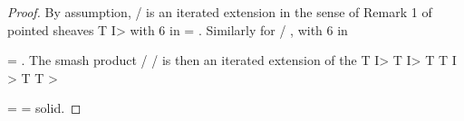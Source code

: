 \documentclass[11pt,a4paper]{article}
\theoremstyle{plain}
\theoremstyle{definition}
\begin{document}
\begin{proof} By assumption, / is an iterated extension in the sense of Remark 1 of
pointed sheaves T I> with 
6 in = . Similarly for /  , with  6 in


= . The smash product / / is then an iterated extension of the
T I>
T  I> 
T T  I >  T 
T >  
























=  =  solid.

\end{proof}
\end{document}
